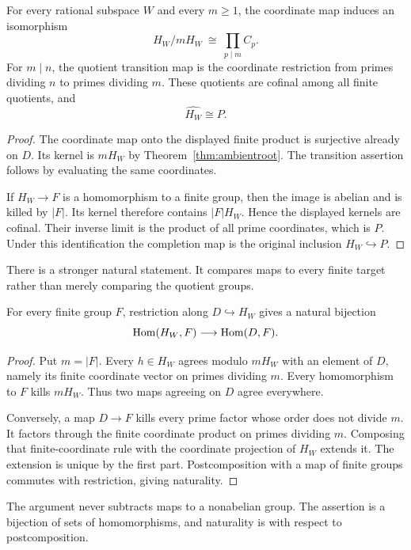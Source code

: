 \begin{theorem}
\label{thm:generalquotients}
For every rational subspace $W$ and every $m\ge1$, the coordinate map induces an isomorphism
\[
H_W/mH_W\ \cong\ \prod_{p\mid m}C_p.
\]
For $m\mid n$, the quotient transition map is the coordinate restriction from primes dividing $n$ to primes dividing $m$. These quotients are cofinal among all finite quotients, and
\[
\widehat{H_W}\cong P.
\]
\end{theorem}
\begin{proof}
The coordinate map onto the displayed finite product is surjective already on $D$. Its kernel is $mH_W$ by Theorem~\ref{thm:ambientroot}. The transition assertion follows by evaluating the same coordinates.

If $H_W\to F$ is a homomorphism to a finite group, then the image is abelian and is killed by $\lvert F\rvert$. Its kernel therefore contains $\lvert F\rvert H_W$. Hence the displayed kernels are cofinal. Their inverse limit is the product of all prime coordinates, which is $P$. Under this identification the completion map is the original inclusion $H_W\hookrightarrow P$.
\end{proof}
There is a stronger natural statement. It compares maps to every finite target rather than merely comparing the quotient groups.

\begin{proposition}
\label{thm:finitehom}
For every finite group $F$, restriction along $D\hookrightarrow H_W$ gives a natural bijection
\[
\operatorname{Hom}(H_W,F)\longrightarrow\operatorname{Hom}(D,F).
\]
\end{proposition}
\begin{proof}
Put $m=\lvert F\rvert$. Every $h\in H_W$ agrees modulo $mH_W$ with an element of $D$, namely its finite coordinate vector on primes dividing $m$. Every homomorphism to $F$ kills $mH_W$. Thus two maps agreeing on $D$ agree everywhere.

Conversely, a map $D\to F$ kills every prime factor whose order does not divide $m$. It factors through the finite coordinate product on primes dividing $m$. Composing that finite-coordinate rule with the coordinate projection of $H_W$ extends it. The extension is unique by the first part. Postcomposition with a map of finite groups commutes with restriction, giving naturality.
\end{proof}
The argument never subtracts maps to a nonabelian group. The assertion is a bijection of sets of homomorphisms, and naturality is with respect to postcomposition.

